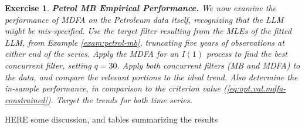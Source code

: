 \documentclass[a4paper]{book}
\newtheorem{Exercise}{Exercise}
\begin{document}
\begin{Exercise} {\bf Petrol MB Empirical Performance.}  \rm
\label{exer:petrol-mb3}
 We now examine the performance of MDFA   on the Petroleum data itself,
 recognizing that the LLM might be mis-specified.  
 Use the target filter resulting from the MLEs of the fitted LLM,
  from Example \ref{exam:petrol-mb}, truncating five years of observations at either end
   of the series.  
 Apply the  MDFA  for an $I(1)$ process  to find the best
 concurrent filter, setting $q= 30$.
  Apply both concurrent filters (MB and MDFA)
 to the data, and compare the relevant portions to the ideal trend.
 Also determine the in-sample performance, in comparison to the criterion value
 (\ref{eq:opt.val.mdfa-constrained}).   Target the trends for both time series.
\end{Exercise}
    
   
HERE  some discussion, and tables summarizing the results    
   


\end{document}

